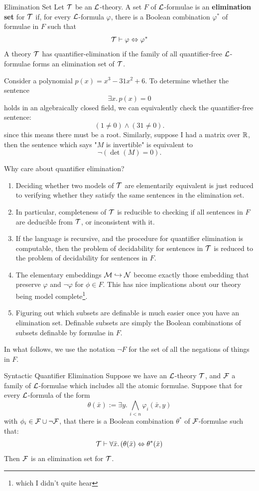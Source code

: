 \documentclass{article}
\numberwithin{thm}{subsection}
\begin{document}
\begin{fancydefine}{Elimination Set}
    Let $\mathcal{T}$ be an $\mathcal{L}$-theory. A set $F$ of $\mathcal{L}$-formulae is an \textbf{elimination set} for $\mathcal{T}$ if, for every $\mathcal{L}$-formula $\varphi$, there is a Boolean combination $\varphi^{*}$ of formulae in $F$ such that \[ \mathcal{T} \vdash \varphi \Leftrightarrow \varphi^{*} \] A theory $\mathcal{T}$ has quantifier-elimination if the family of all quantifier-free $\mathcal{L}$-formulae forms an elimination set of $\mathcal{T}$.
\end{fancydefine}
\begin{ex}
    Consider a polynomial $p(x)=x^{3}-31x^{2}+6$. To determine whether the sentence \[ \exists x.\, p(x)=0\] holds in an algebraically closed field, we can equivalently check the quantifier-free sentence: \[ (1 \neq 0) \wedge (31 \neq 0). \] since this means there must be a root. \gap Similarly, suppose I had a matrix over $\mathbb{R}$, then the sentence which says "$M$ is invertible" is equivalent to \[ \neg (\det(M)=0).\]
\end{ex}
Why care about quantifier elimination?
\begin{enumerate}
    \item Deciding whether two models of $\mathcal{T}$ are elementarily equivalent is just reduced to verifying whether they satisfy the same sentences in the elimination set.
    \item In particular, completeness of $\mathcal{T}$ is reducible to checking if all sentences in $F$ are deducible from $\mathcal{T}$, or inconsistent with it.
    \item If the language is recursive, and the procedure for quantifier elimination is computable, then the problem of decidability for sentences in $\mathcal{T}$ is reduced to the problem of decidability for sentences in $F$.
    \item The elementary embeddings $\mathcal{M} \hookrightarrow \mathcal{N}$ become exactly those embedding that preserve $\varphi$ and $\neg \varphi$ for $\phi \in F$. This has nice implications about our theory being model complete\footnote{which I didn't quite hear}.
    \item Figuring out which subsets are definable is much easier once you have an elimination set. Definable subsets are simply the Boolean combinations of subsets definable by formulae in $F$.
\end{enumerate}
In what follows, we use the notation $\neg F$ for the set of all the negations of things in $F$.
\begin{fancyprop}{Syntactic Quantifier Elimination}
    Suppose we have an $\mathcal{L}$-theory $\mathcal{T}$, and $\mathcal{F}$ a family of $\mathcal{L}$-formulae which includes all the atomic formulae. Suppose that for every $\mathcal{L}$-formula of the form \[ \theta(\bar x) := \exists y. \, \bigwedge_{i<n} \varphi_{i}(\bar x, y) \] with $\phi_{i} \in \mathcal{F} \cup \neg \mathcal{F}$, that there is a Boolean combination $\theta^{*}$ of $\mathcal{F}$-formulae such that: \[ \mathcal{T} \vdash \forall \bar x. \, (\theta(\bar x) \Leftrightarrow \theta^{*}(\bar x)\] Then $\mathcal{F}$ is an elimination set for $\mathcal{T}$. 
\end{fancyprop}
\end{document}

